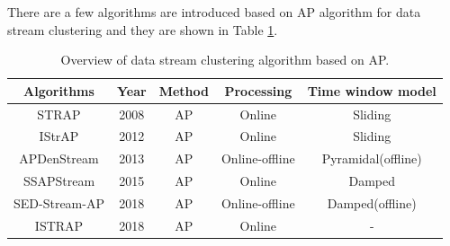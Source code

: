 \documentclass[../UNBThesis2.tex]{subfiles}
\begin{document}


There are a few algorithms are introduced based on AP algorithm for data stream clustering and they are shown in Table \ref{APCLU}. 


\begin{table}[!h]
    \centering
    \caption{Overview of data stream clustering algorithm based on AP. }
    \label{APCLU}
    \small
    \begin{tabular}{c c c c c}
    \hline
      \textbf{Algorithms} & \textbf{Year} & \textbf{ Method } & \textbf{Processing} & \textbf{Time window model}\\
     \hline \midrule
     STRAP                &   2008        &    AP             &    Online          & Sliding \\
     \hline 
     IStrAP               &   2012        &    AP             &    Online          & Sliding \\
    \hline
     APDenStream          &   2013        &    AP             &     Online-offline & Pyramidal(offline)   \\
     \hline
     SSAPStream           &   2015        &    AP             &     Online         &   Damped    \\
    \hline
     SED-Stream-AP        &   2018        &    AP             &    Online-offline   & Damped(offline)\\
     \hline
     ISTRAP               &   2018        &    AP             &   Online           & - \\
\bottomrule
    \end{tabular}
\end{table}
\end{document}
